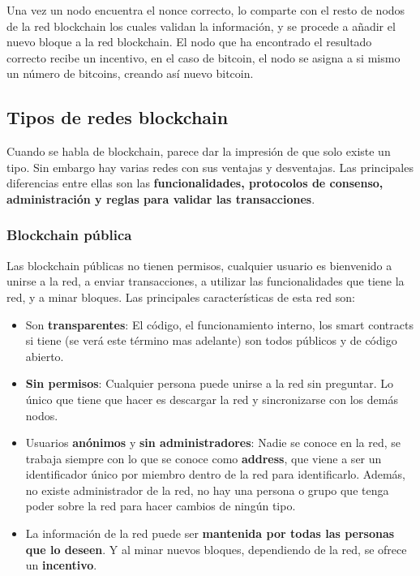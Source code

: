 Una vez un nodo encuentra el nonce correcto, lo comparte con el resto de nodos de la red blockchain los cuales validan la información, y se procede a añadir el nuevo bloque a la red blockchain. El nodo que ha encontrado el resultado correcto recibe un incentivo, en el caso de bitcoin, el nodo se asigna a si mismo un número de bitcoins, creando así nuevo bitcoin. 

\subsection{Tipos de redes blockchain}

Cuando se habla de blockchain, parece dar la impresión de que solo existe un tipo. Sin embargo hay varias redes con sus ventajas y desventajas\cite{tiposBlock1, tiposBlock2}. Las principales diferencias entre ellas son las \textbf{funcionalidades, protocolos de consenso, administración y reglas para validar las transacciones}.

\subsubsection{Blockchain pública}

Las blockchain públicas no tienen permisos, cualquier usuario es bienvenido a unirse a la red, a enviar transacciones, a utilizar las funcionalidades que tiene la red, y a minar bloques. Las principales características de esta red son:
\begin{itemize}
\item Son \textbf{transparentes}: El código, el funcionamiento interno, los smart contracts si tiene (se verá este término mas adelante) son todos públicos y de código abierto.
\item \textbf{Sin permisos}: Cualquier persona puede unirse a la red sin preguntar. Lo único que tiene que hacer es descargar la red y sincronizarse con los demás nodos.
\item Usuarios \textbf{anónimos} y \textbf{sin administradores}: Nadie se conoce en la red, se trabaja siempre con lo que se conoce como \textbf{address}, que viene a ser un identificador único por miembro dentro de la red para identificarlo. Además, no existe administrador de la red, no hay una persona o grupo que tenga poder sobre la red para hacer cambios de ningún tipo.
\item La información de la red puede ser \textbf{mantenida por todas las personas que lo deseen}. Y al minar nuevos bloques, dependiendo de la red, se ofrece un \textbf{incentivo}.
\end{itemize}

